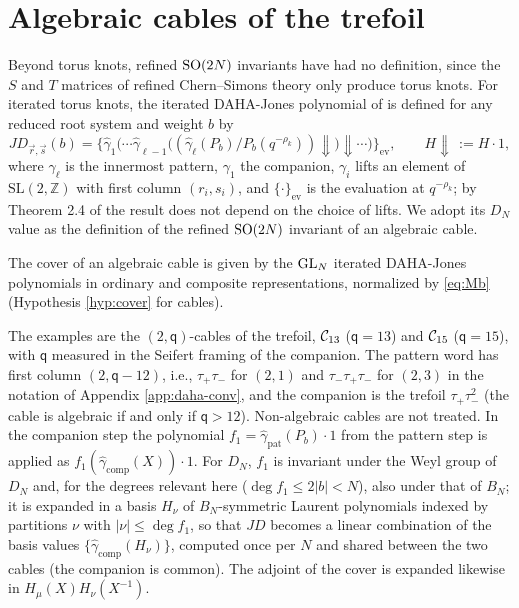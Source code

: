 \section{Algebraic cables of the trefoil}\label{sec:cable}
Beyond torus knots, refined $\mathrm{SO}(2N)$ invariants have had no definition, since the $S$ and $T$ matrices of refined Chern--Simons theory only produce torus knots. For iterated torus knots, the iterated DAHA-Jones polynomial of \cite{CD14} is defined for any reduced root system and weight $b$ by
\begin{equation}\label{eq:iterJD}
JD_{\vec r,\vec s}(b) = \bigl\{\hat\gamma_1\bigl(\cdots\hat\gamma_{\ell-1}\bigl((\hat\gamma_\ell(P_b)/P_b(q^{-\rho_k}))\!\Downarrow\bigr)\!\Downarrow\cdots\bigr)\bigr\}_{\mathrm{ev}},\qquad H\!\Downarrow\, := H\cdot 1,
\end{equation}
where $\gamma_\ell$ is the innermost pattern, $\gamma_1$ the companion, $\gamma_i$ lifts an element of $\mathrm{SL}(2,\mathbb{Z})$ with first column $(r_i, s_i)$, and $\{\cdot\}_{\mathrm{ev}}$ is the evaluation at $q^{-\rho_k}$; by Theorem 2.4 of \cite{CD14} the result does not depend on the choice of lifts. We adopt its $D_N$ value as the definition of the refined $\mathrm{SO}(2N)$ invariant of an algebraic cable.
\begin{hypothesis}\label{hyp:cablecover}
The cover of an algebraic cable is given by the $\mathrm{GL}_N$ iterated DAHA-Jones polynomials in ordinary and composite representations, normalized by \eqref{eq:Mb} (Hypothesis \ref{hyp:cover} for cables).
\end{hypothesis}
The examples are the $(2, \mathsf{q})$-cables of the trefoil, $\mathcal{C}_{13}$ ($\mathsf{q} = 13$) and $\mathcal{C}_{15}$ ($\mathsf{q} = 15$), with $\mathsf{q}$ measured in the Seifert framing of the companion. The pattern word has first column $(2, \mathsf{q} - 12)$, i.e., $\tau_+\tau_-$ for $(2,1)$ and $\tau_-\tau_+\tau_-$ for $(2,3)$ in the notation of Appendix \ref{app:daha-conv}, and the companion is the trefoil $\tau_+\tau_-^2$ (the cable is algebraic if and only if $\mathsf{q} > 12$). Non-algebraic cables are not treated.
In the companion step the polynomial $f_1 = \hat\gamma_{\mathrm{pat}}(P_b)\cdot 1$ from the pattern step is applied as $f_1(\hat\gamma_{\mathrm{comp}}(X))\cdot 1$. For $D_N$, $f_1$ is invariant under the Weyl group of $D_N$ and, for the degrees relevant here ($\deg f_1 \le 2|b| < N$), also under that of $B_N$; it is expanded in a basis $H_\nu$ of $B_N$-symmetric Laurent polynomials indexed by partitions $\nu$ with $|\nu| \le \deg f_1$, so that $JD$ becomes a linear combination of the basis values $\{\hat\gamma_{\mathrm{comp}}(H_\nu)\}$, computed once per $N$ and shared between the two cables (the companion is common). The adjoint of the cover is expanded likewise in $H_\mu(X)H_\nu(X^{-1})$.

